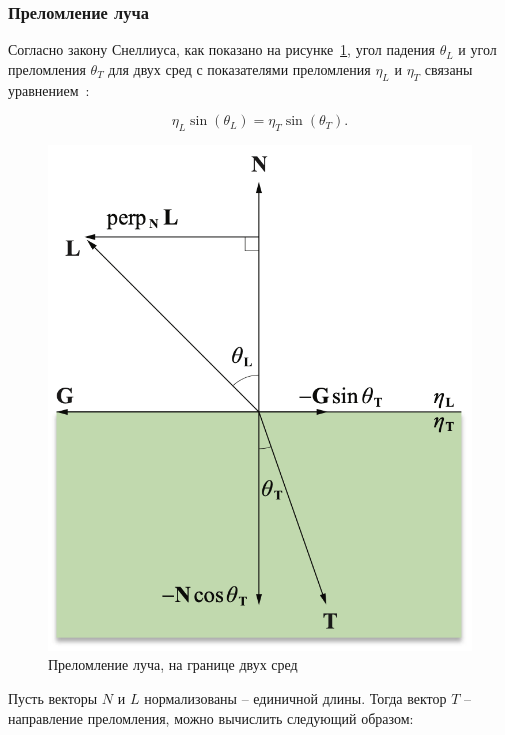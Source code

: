 \subsubsection*{Преломление луча}

Согласно закону Снеллиуса, как показано на рисунке~\ref{fig:2}, угол падения \( \theta_L \) и угол преломления \( \theta_T \) для двух сред с показателями преломления $\eta_L$ и $\eta_T$ связаны уравнением~\cite[c.~151]{lengyel2011mathematics}:

\begin{equation}
	\eta_L \sin(\theta_L) = \eta_T \sin(\theta_T).
\end{equation}

\begin{figure}[ht!]
	\begin{center}
		\includegraphics[scale=0.6]{img/refraction.png}
	\end{center}
	\caption{Преломление луча, на границе двух сред~\cite[c.~152]{lengyel2011mathematics}}
	\label{fig:2}
\end{figure}

Пусть векторы $N$ и $L$ нормализованы -- единичной длины. Тогда вектор $T$ -- направление преломления, можно вычислить следующий образом:

